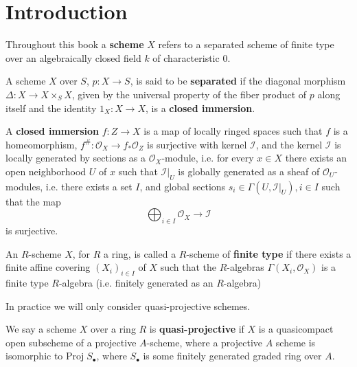 %
%
%
\chapter{Introduction}
\label{intro} %


Throughout this book a \textbf{scheme} $X$ refers to a separated scheme of finite type over an algebraically closed field $k$ of characteristic $0$.

\begin{definition}
    A scheme $X$ over $S$, $p:X\rightarrow S$, is said to be \textbf{separated} if the diagonal morphism $\Delta:X\rightarrow X\times_SX$, given by the universal property of the fiber product of $p$ along itself and the identity $1_X:X\rightarrow X$, is a \textbf{closed immersion}.

    A \textbf{closed immersion} $f:Z\rightarrow X$ is a map of locally ringed spaces such that $f$ is a homeomorphism, $f^{\#}:\mathcal{O}_X\rightarrow f_*\mathcal{O}_Z$ is surjective with kernel $\mathcal{I}$, and the kernel $\mathcal{I}$ is locally generated by sections as a $\mathcal{O}_X$-module, i.e. for every $x \in X$ there exists an open neighborhood $U$ of $x$ such that $\mathcal{I}\vert_U$ is globally generated as a sheaf of $\mathcal{O}_U$-modules, i.e. there exists a set $I$, and global sections $s_i \in \Gamma(U,\mathcal{I}\vert_U), i \in I$ such that the map $$\bigoplus_{i \in I}\mathcal{O}_X\rightarrow \mathcal{I}$$
    is surjective.
\end{definition}


\begin{definition}
    An $R$-scheme $X$, for $R$ a ring, is called a $R$-scheme of \textbf{finite type} if there exists a finite affine covering $(X_i)_{i \in I}$ of $X$ such that the $R$-algebras $\Gamma(X_i,\mathcal{O}_X)$ is a finite type $R$-algebra (i.e. finitely generated as an $R$-algebra)
\end{definition}


In practice we will only consider quasi-projective schemes.

\begin{definition}
    We say a scheme $X$ over a ring $R$ is \textbf{quasi-projective} if $X$ is a quasicompact open subscheme of a projective $A$-scheme, where a projective $A$ scheme is isomorphic to $\text{Proj}\;S_{\bullet}$, where $S_{\bullet}$ is some finitely generated graded ring over $A$.
\end{definition}

